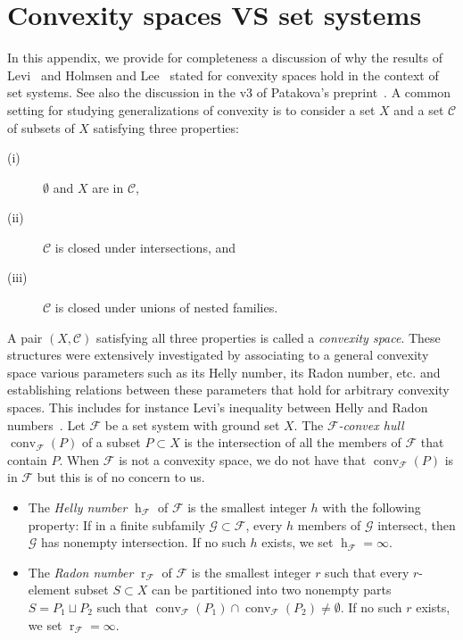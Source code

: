 \documentclass[11pt]{article}
\newcommand{\C}{\mathcal{C}}
\newcommand{\F}{\mathcal{F}}
\newcommand{\G}{\mathcal{G}}
\DeclareMathOperator{\h}{h}
\DeclareMathOperator{\conv}{conv}
\DeclareMathOperator{\rad}{r}
\newcommand{\defn}[1]{\emph{\color{violet}#1}}
\begin{document}
\section{Convexity spaces VS set systems}\label{app:convspaces}
%
In this appendix, we provide for completeness a discussion of why the results of Levi~\cite{Levi_radon_implies_helly} and Holmsen and Lee~\cite{Holmsen2021} stated for convexity spaces hold in the context of set systems. See also the discussion in the v3 of Patakova's preprint~\cite[Appendix~A]{Pat_kov__2024}.
%
\bigskip
%
A common setting for studying generalizations of convexity is to consider a set $X$ and a set $\C$ of subsets of $X$ satisfying three properties:
%
\begin{description}
\item[(i)] $\emptyset$ and $X$ are in $\C$,
\item[(ii)] $\C$ is closed under intersections, and
\item[(iii)] $\C$ is closed under unions of nested families.
\end{description}
%
\noindent
A pair $(X,\C)$ satisfying all three properties is called a \defn{convexity space}. These structures were extensively investigated by associating to a general convexity space various parameters such as its Helly number, its Radon number, etc. and establishing relations between these parameters that hold for arbitrary convexity spaces. This includes for instance Levi's inequality between Helly and Radon numbers~\cite{Levi_radon_implies_helly}.
%
\medskip
%
Let $\F$ be a set system with ground set $X$. The \defn{$\F$-convex hull} $\conv_{\F}(P)$ of a subset $P\subset X$ is the intersection of all the members of $\F$ that contain $P$. When $\F$ is not a convexity space, we do not have that $\conv_{\F}(P)$ is in $\F$ but this is of no concern to us.
%
\begin{itemize}
\item The \defn{Helly number} $\h_\F$ of $\F$ is the smallest integer $h$ with the following property: If in a finite subfamily $\G \subset\F$, every $h$ members of $\G$ intersect, then $\G$ has nonempty intersection. If no such $h$ exists, we set $\h_\F=\infty$.\medskip
%
\item The \defn{Radon number} $\rad_\F$ of $\F$ is the smallest integer $r$ such that every $r$-element subset $S\subset X$ can be partitioned into two nonempty parts $S=P_1\sqcup P_2$ such that $\conv_{\F}(P_1) \cap \conv_{\F}(P_2) \neq \emptyset$. If no such $r$ exists, we set $\rad_\F=\infty$.
\end{itemize}
\end{document}
